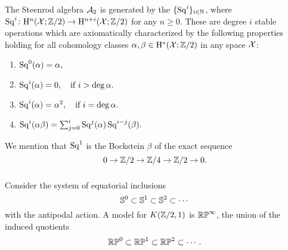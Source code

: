 %

\subsubsection{}

The Steenrod algebra $\mathcal{A}_2$ is generated by the  $\{\operatorname{Sq}^i\}_{i \in \mathbb{N}}$, where $\operatorname{Sq}^i \colon \mathrm{H}^n(\mathcal{X}; \mathbb{Z}/2) \to \mathrm{H}^{n+i}(\mathcal{X}; \mathbb{Z}/2)$ for any $n\geq 0$.
These are degree $i$ stable operations which are axiomatically characterized by the following properties holding for all cohomology classes $\alpha,\beta \in \mathrm{H}^*(\mathcal{X}; \mathbb{Z}/2)$ in any space $\mathcal{X}$:
\begin{enumerate}
	\item \(\operatorname{Sq}^0(\alpha) = \alpha,\)
	\item \(\operatorname{Sq}^i(\alpha) = 0, \quad \text{if } i > \deg\alpha.\)
	\item \(\operatorname{Sq}^i(\alpha) = \alpha^2, \quad \text{if } i = \deg\alpha.\)
	\item \(\operatorname{Sq}^i(\alpha \beta) = \textstyle\sum_{j=0}^{i} \operatorname{Sq}^j(\alpha) \operatorname{Sq}^{i-j}(\beta).\)
\end{enumerate}
We mention that $\operatorname{Sq}^1$ is the Bockstein $\beta$ of the exact sequence
\[
0 \to \mathbb{Z}/2 \to \mathbb{Z}/4 \to \mathbb{Z}/2 \to 0.
\]

\subsubsection{}

Consider the system of equatorial inclusions
\[
\mathbb{S}^0 \subset \mathbb{S}^1 \subset \mathbb{S}^2 \subset \dotsb
\]
with the antipodal action.
A model for \(K(\mathbb{Z}/2, 1)\) is \(\mathbb{RP}^\infty\), the union of the induced quotients
\[
\mathbb{RP}^0 \subset \mathbb{RP}^1 \subset \mathbb{RP}^2 \subset \dotsb.
\]

